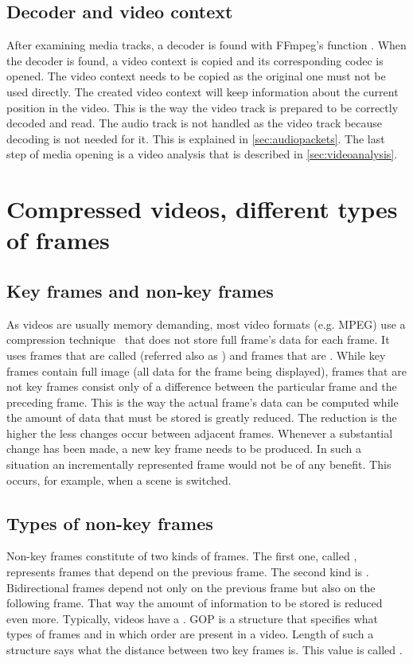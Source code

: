 \subsection{Decoder and video context}
After examining media tracks, a decoder is found with FFmpeg’s function . When the decoder is found, a video context is copied and its corresponding codec is opened. The video context needs to be copied as the original one must not be used directly. The created video context will keep information about the current position in the video. This is the way the video track is prepared to be correctly decoded and read. The audio track is not handled as the video track because decoding is not needed for it. This is explained in \autoref{sec:audiopackets}. The last step of media opening is a video analysis that is described in \autoref{sec:videoanalysis}.

\section{Compressed videos, different types of frames}\label{sec:videocompression}
\subsection{Key frames and non-key frames}\label{subs:keyframes}
As videos are usually memory demanding, most video formats (e.g. MPEG) use a compression technique~\cite{compression_techniques} that does not store full frame’s data for each frame. It uses frames that are called  (referred also as ) and frames that are . While key frames contain full image (all data for the frame being displayed), frames that are not key frames consist only of a difference between the particular frame and the preceding frame. This is the way the actual frame’s data can be computed while the amount of data that must be stored is greatly reduced. The reduction is the higher the less changes occur between adjacent frames. Whenever a substantial change has been made, a new key frame needs to be produced. In such a situation an incrementally represented frame would not be of any benefit. This occurs, for example, when a scene is switched.

\subsection{Types of non-key frames}
Non-key frames constitute of two kinds of frames. The first one, called , represents frames that depend on the previous frame. The second kind is . Bidirectional frames depend not only on the previous frame but also on the following frame. That way the amount of information to be stored is reduced even more. Typically, videos have a . GOP is a structure that specifies what types of frames and in which order are present in a video. Length of such a structure says what the distance between two key frames is. This value is called .

